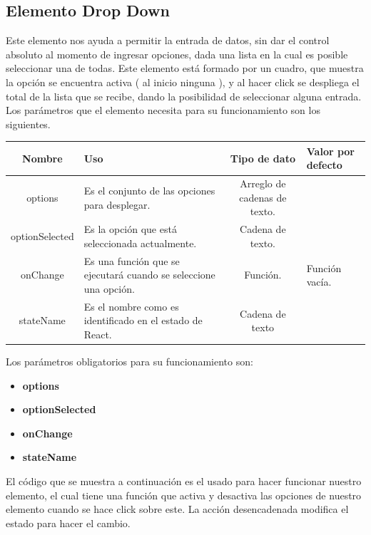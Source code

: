 \subsection{Elemento Drop Down}
    Este elemento nos ayuda a permitir la entrada de datos, sin dar el control absoluto al momento de ingresar opciones, dada una lista en la cual es posible seleccionar una de todas. Este elemento está formado por un cuadro, que muestra la opción se encuentra activa ( al inicio ninguna ), y al hacer click se despliega el total de la lista que se recibe, dando la posibilidad de seleccionar alguna entrada.
    Los parámetros que el elemento necesita para su funcionamiento son los siguientes.
    \newline
    \newline
    \begin{center}
     \begin{tabular}{ | c |  p{5cm}  | c | p{3cm} |} 
     \hline
     \textbf{Nombre} &  \textbf{Uso} &  \textbf{ Tipo de dato} &  \textbf{Valor por defecto}\\ [0.5ex] 
     \hline\hline
     options&  Es el conjunto de las opciones para desplegar. &   Arreglo de cadenas de texto. & \\  [2.5ex] 
     \hline
     optionSelected &  Es la opción que está seleccionada actualmente. &   Cadena de texto. & \\  [2.5ex] 
     \hline
     onChange &  Es una función que se ejecutará cuando se seleccione una opción. &   Función. & Función vacía. \\  [2.5ex] 
     \hline
     stateName &  Es el nombre como es identificado en el estado de React. &  Cadena de texto & \\  [2.5ex] 
     \hline
    \end{tabular}
    \end{center}
    \newline
    \newline
Los parámetros obligatorios para su funcionamiento son:
\begin{itemize}
\item \textbf{options} 
\item \textbf{optionSelected} 
\item \textbf{onChange} 
\item \textbf{stateName} 
\end{itemize}
\newline
    \newline
    El código que se muestra a continuación es el usado para hacer funcionar nuestro elemento, el cual tiene una función que activa y desactiva las opciones de nuestro elemento cuando se hace click sobre este. La acción desencadenada modifica el estado para hacer el cambio.
